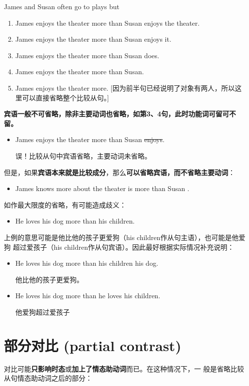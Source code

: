 James and Susan often go to plays but
\begin{enumerate}
\item James enjoys the theater more than Susan enjoys the theater.
\item James enjoys the theater more than Susan enjoys it.
\item James enjoys the theater more than Susan does.
\item James enjoys the theater more than Susan.
\item James enjoys the theater more. [因为前半句已经说明了对象有两人，所以这
  里可以直接省略整个比较从句。]
\end{enumerate}

\textbf{宾语一般不可省略，除非主要动词也省略，如第3、4句，此时功能词可留可不留。}
\begin{itemize}
\item James enjoys the theater more than Susan \sout{enjoys}.

  误！比较从句中宾语省略，主要动词未省略。
\end{itemize}

但是，如果\textbf{宾语本来就是比较成分}，那么\textbf{可以省略宾语，而不省略主要动词}：
\begin{itemize}
\item James knows more about the theater is more than Susan .
\end{itemize}


如作最大限度的省略，有可能造成歧义：
\begin{itemize}
\item He loves his dog more than his children.
\end{itemize}
上例的意思可能是他比他的孩子更爱狗（his children作从句主语），也可能是他爱狗
超过爱孩子（his children作从句宾语）。因此最好根据实际情况补充说明：
\begin{itemize}
\item He loves his dog more than his children  his dog.

  他比他的孩子更爱狗。
\item He loves his dog more than he loves his children.

  他爱狗超过爱孩子
\end{itemize}


\section{部分对比 (partial contrast)}

对比可能\textbf{只影响时态}或\textbf{加上了情态助动词}而已。在这种情况下，一
般是省略比较从句情态助动词之后的部分：

